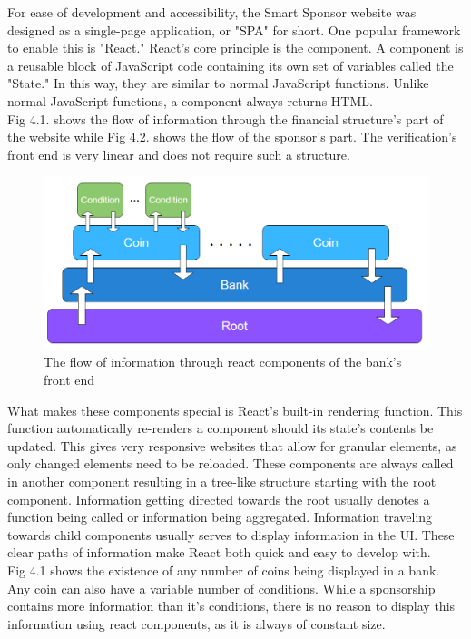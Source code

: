 For ease of development and accessibility, the Smart Sponsor website was designed as a single-page application, or "SPA" for short. One popular framework to enable this is "React." React's core principle is the component. A component is a reusable block of JavaScript code containing its own set of variables called the "State." In this way, they are similar to normal JavaScript functions. Unlike normal JavaScript functions, a component always returns HTML.\\
Fig 4.1. shows the flow of information through the financial structure's part of the website while Fig 4.2. shows the flow of the sponsor's part. The verification's front end is very linear and does not require such a structure.\\
\begin{figure}[H]
    \centering
    \includegraphics[scale=0.5]{figures/bank front end.PNG}  
    \caption{The flow of information through react components of the bank's front end}
    \label{fig:bankfront}
\end{figure}
What makes these components special is React's built-in rendering function. This function automatically re-renders a component should its state's contents be updated. This gives very responsive websites that allow for granular elements, as only changed elements need to be reloaded. These components are always called in another component resulting in a tree-like structure starting with the root component. Information getting directed towards the root usually denotes a function being called or information being aggregated. Information traveling towards child components usually serves to display information in the UI. These clear paths of information make React both quick and easy to develop with.\\
Fig 4.1 shows the existence of any number of coins being displayed in a bank. Any coin can also have a variable number of conditions. While a sponsorship contains more information than it's conditions, there is no reason to display this information using react components, as it is always of constant size.\\
